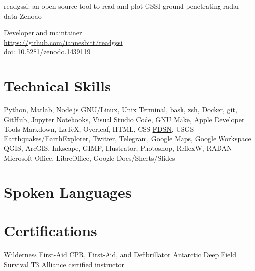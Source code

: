 \documentclass[a4paper,12pt,sans,colorlinks]{moderncv}
\newcommand{\fdsn}{\href{https://www.fdsn.org/services/}{FDSN}}
\newcommand{\doi}[1]{%
    \href{https://doi.org/#1}{#1}
}
\begin{document}
{readgssi: an open-source tool to read and plot GSSI
ground-penetrating radar data}
{Zenodo}
{}
{}
{
    Developer and maintainer
    \\
    \url{https://github.com/iannesbitt/readgssi}
    \\
    doi: \doi{10.5281/zenodo.1439119}
}





\section{Technical Skills}

{
    Python, Matlab, Node.js
}
{
    GNU/Linux, Unix Terminal, bash, zsh, Docker, git, GitHub, Jupyter
    Notebooks, Visual Studio Code, GNU Make, Apple Developer Tools
}
{
    Markdown, \LaTeX, Overleaf, HTML, CSS
}
{
    \fdsn, USGS Earthquakes/EarthExplorer, Twitter, Telegram, Google Maps, Google
    Workspace
}
{
    QGIS, ArcGIS, Inkscape, GIMP, Illustrator, Photoshop, ReflexW, RADAN
}
{
    Microsoft Office, LibreOffice, Google Docs/Sheets/Slides
}

\section{Spoken Languages}


\section{Certifications}

{
    Wilderness First-Aid
}
{
    CPR, First-Aid, and Defibrillator
}
{
    Antarctic Deep Field Survival
}
{
    T3 Alliance certified instructor
}
\end{document}
